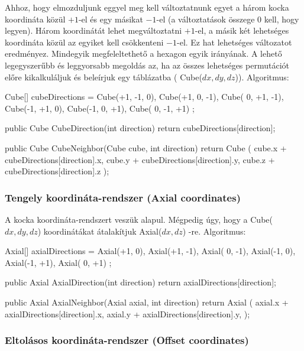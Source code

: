 \noindent Ahhoz, hogy elmozduljunk eggyel meg kell változtatnunk egyet a három kocka koordináta közül $+1$-el és egy másikat $-1$-el (a változtatások összege $0$ kell, hogy legyen). Három koordinátát lehet megváltoztatni $+1$-el, a másik két lehetséges koordináta közül az egyiket kell csökkenteni $-1$-el. Ez hat lehetséges változatot eredményez. Mindegyik megfeleltethető a hexagon egyik irányának. A lehető legegyszerűbb és leggyorsabb megoldás az, ha az összes lehetséges permutációt előre kikalkuláljuk és beleírjuk egy táblázatba ( Cube($dx, dy, dz$)).
\newline
\newline Algoritmus: 
\begin{cpp}
Cube[] cubeDirections = 
{ 
   Cube(+1, -1,  0), Cube(+1,  0, -1), Cube( 0, +1, -1),
   Cube(-1, +1,  0), Cube(-1,  0, +1), Cube( 0, -1, +1) 
};

public Cube CubeDirection(int direction)
{
   return cubeDirections[direction];
}

public Cube CubeNeighbor(Cube cube, int direction)
{
   return Cube
   (
      cube.x + cubeDirections[direction].x, 
      cube.y + cubeDirections[direction].y, 
      cube.z + cubeDirections[direction].z
   );
}
\end{cpp}

\subsubsection{Tengely koordináta-rendszer (Axial coordinates)}

\noindent A kocka koordináta-rendszert veszük alapul. Mégpedig úgy, hogy a Cube($ dx, dy, dz$) koordinátákat átalakítjuk Axial($ dx, dz$) -re.
\newline
\newline Algoritmus:
\begin{cpp}
Axial[] axialDirections = 
{ 
   Axial(+1,  0), Axial(+1, -1), Axial( 0, -1),
   Axial(-1,  0), Axial(-1, +1), Axial( 0, +1)
};

public Axial AxialDirection(int direction)
{
   return axialDirections[direction];
}

public Axial AxialNeighbor(Axial axial, int direction)
{
   return Axial
   (
      axial.x + axialDirections[direction].x, 
      axial.y + axialDirections[direction].y, 
   );
}
\end{cpp}

\subsubsection{Eltolásos koordináta-rendszer (Offset coordinates)}

